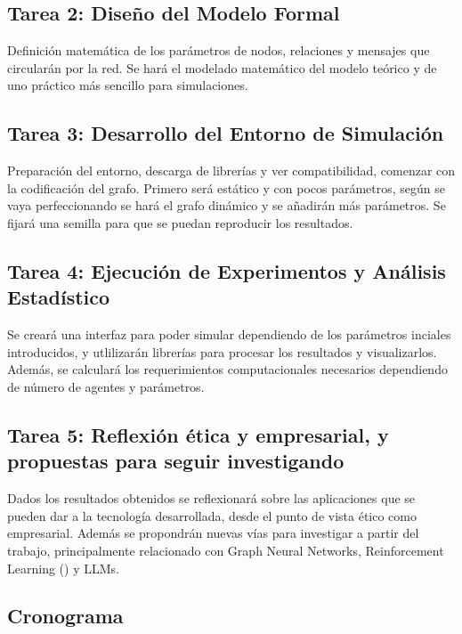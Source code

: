 \documentclass[12pt]{extarticle}
\numberwithin{equation}{section}
\begin{document}
\subsection{Tarea 2: Diseño del Modelo Formal}
Definición matemática de los parámetros de nodos, relaciones y mensajes que circularán por la red. Se hará el modelado matemático del modelo teórico y de uno práctico más sencillo para simulaciones.

\subsection{Tarea 3: Desarrollo del Entorno de Simulación}
Preparación del entorno, descarga de librerías y ver compatibilidad, comenzar con la codificación del grafo. Primero será estático y con pocos parámetros, según se vaya perfeccionando se hará el grafo dinámico y se añadirán más parámetros. Se fijará una semilla para que se puedan reproducir los resultados.

\subsection{Tarea 4: Ejecución de Experimentos y Análisis Estadístico}
Se creará una interfaz para poder simular dependiendo de los parámetros inciales introducidos, y utlilizarán librerías para procesar los resultados y visualizarlos. Además, se calculará los requerimientos computacionales necesarios dependiendo de número de agentes y parámetros.

\subsection{Tarea 5: Reflexión ética y empresarial, y propuestas para seguir investigando}
Dados los resultados obtenidos se reflexionará sobre las aplicaciones que se pueden dar a la tecnología desarrollada, desde el punto de vista ético como empresarial. Además se propondrán nuevas vías para investigar a partir del trabajo, principalmente relacionado con Graph Neural Networks, Reinforcement Learning (\cite{SuttonBarto2018}) y LLMs. 


\subsection{Cronograma} \label{sec:cronogram}
\end{document}
